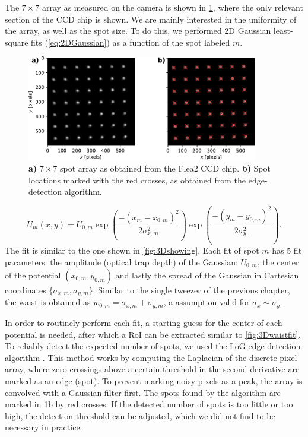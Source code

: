 The $7\times7$ array as measured on the camera is shown in \cref{fig:CameraLoG}, where the only relevant section of the CCD chip is shown. 
We are mainly interested in the uniformity of the array, as well as the spot size.
To do this, we performed 2D Gaussian least-square fits (\cref{eq:2DGaussian}) as a function of the spot labeled $m$.

\begin{figure}
    \centering
    \includegraphics[width=0.9\textwidth]{figures/CamImgLoGSpots.pdf}
    \caption{\textbf{a)} $7\times7$ spot array as obtained from the Flea2 CCD chip.
    \textbf{b)} Spot locations marked with the red crosses, as obtained from the edge-detection algorithm. }
    \label{fig:CameraLoG}
\end{figure}

\begin{equation}\label{eq:2DGaussianNumberK}
    U_m(x,y) = U_{0,m}\exp{\left(\frac{-(x_m-x_{0,m})^2}{2\sigma_{x,m}^2}\right)}
    \exp{\left( \frac{-(y_m-y_{0,m})^2}{2\sigma_{y,}^2} \right)}.
\end{equation}
The fit is similar to the one shown in \cref{fig:3Dshowing}.
Each fit of spot $m$ has 5 fit parameters: the amplitude (optical trap depth) of the Gaussian: $U_{0,m}$, the center of the potential $(x_{0,m}, y_{0,m})$ and lastly the spread of the Gaussian in Cartesian coordinates $\{\sigma_{x,m},\sigma_{y,m}\}$.
Similar to the single tweezer of the previous chapter, the waist is obtained as $w_{0,m} = \sigma_{x,m}+\sigma_{y,m}$, a assumption valid for $\sigma_x\sim\sigma_y$.

In order to routinely perform each fit, a starting guess for the center of each potential is needed, after which a \ac{RoI} can be extracted similar to \cref{fig:3Dwaistfit}.
To reliably detect the expected number of spots, we used the \ac{LoG} edge detection algorithm \cite{Haralick1992}. This method works by computing the Laplacian of the discrete pixel array, where zero crossings above a certain threshold in the second derivative are marked as an edge (spot). 
To prevent marking noisy pixels as a peak, the array is convolved with a Gaussian filter first. 
The spots found by the algorithm are marked in \ref{fig:CameraLoG}b by red crosses. 
If the detected number of spots is too little or too high, the detection threshold can be adjusted, which we did not find to be necessary in practice. 

